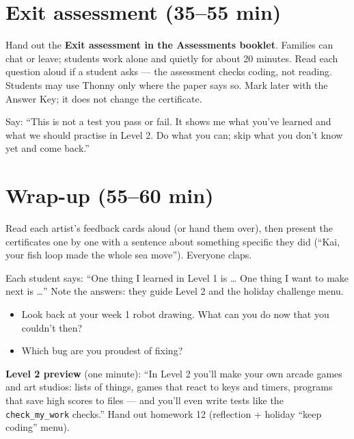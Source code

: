 \section{Exit assessment (35--55 min)}
Hand out the \textbf{Exit assessment in the Assessments booklet}. Families can chat or leave; students work alone and quietly for about 20 minutes. Read each question aloud if a student asks --- the assessment checks coding, not reading. Students may use Thonny only where the paper says so. Mark later with the Answer Key; it does not change the certificate.
\begin{teachernote}
Say: \enquote{This is not a test you pass or fail. It shows me what you've learned and what we should practise in Level 2. Do what you can; skip what you don't know yet and come back.}
\end{teachernote}

\section{Wrap-up (55--60 min)}
Read each artist's feedback cards aloud (or hand them over), then present the certificates one by one with a sentence about something specific they did (\enquote{Kai, your fish loop made the whole sea move}). Everyone claps.
\begin{formativecheck}
Each student says: \enquote{One thing I learned in Level 1 is \ldots{} One thing I want to make next is \ldots} Note the answers: they guide Level 2 and the holiday challenge menu.
\end{formativecheck}
\begin{reflection}
\begin{itemize}[leftmargin=1.2em,itemsep=1pt]
  \item Look back at your week 1 robot drawing. What can you do now that you couldn't then?
  \item Which bug are you proudest of fixing?
\end{itemize}
\textbf{Level 2 preview} (one minute): \enquote{In Level 2 you'll make your own arcade games and art studios: lists of things, games that react to keys and timers, programs that save high scores to files --- and you'll even write tests like the \texttt{check\_my\_work} checks.} Hand out homework 12 (reflection + holiday \enquote{keep coding} menu).
\end{reflection}

